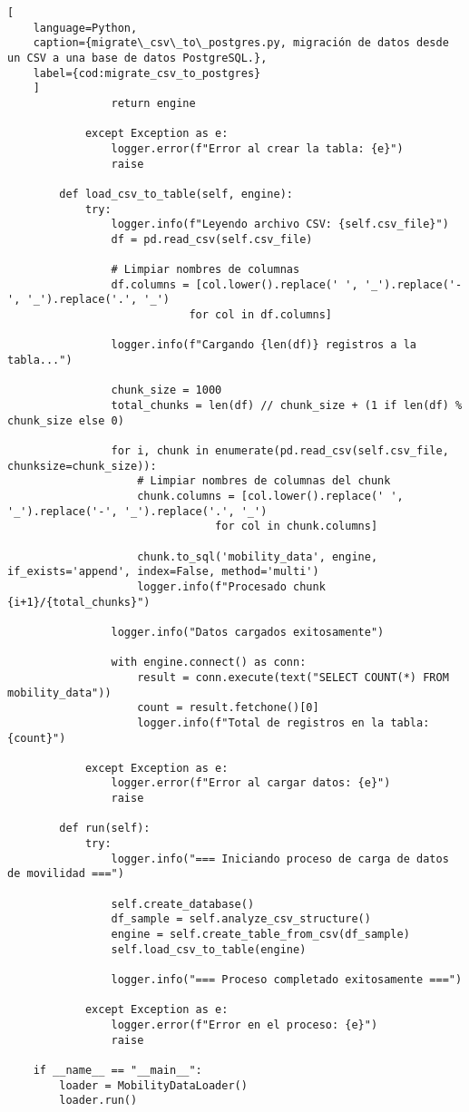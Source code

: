 \begin{lstlisting}[
    language=Python,
    caption={migrate\_csv\_to\_postgres.py, migración de datos desde un CSV a una base de datos PostgreSQL.},
    label={cod:migrate_csv_to_postgres}
    ]
                return engine
                
            except Exception as e:
                logger.error(f"Error al crear la tabla: {e}")
                raise
        
        def load_csv_to_table(self, engine):
            try:
                logger.info(f"Leyendo archivo CSV: {self.csv_file}")
                df = pd.read_csv(self.csv_file)
                
                # Limpiar nombres de columnas
                df.columns = [col.lower().replace(' ', '_').replace('-', '_').replace('.', '_') 
                            for col in df.columns]
                
                logger.info(f"Cargando {len(df)} registros a la tabla...")
                
                chunk_size = 1000
                total_chunks = len(df) // chunk_size + (1 if len(df) % chunk_size else 0)
                
                for i, chunk in enumerate(pd.read_csv(self.csv_file, chunksize=chunk_size)):
                    # Limpiar nombres de columnas del chunk
                    chunk.columns = [col.lower().replace(' ', '_').replace('-', '_').replace('.', '_') 
                                for col in chunk.columns]
                    
                    chunk.to_sql('mobility_data', engine, if_exists='append', index=False, method='multi')
                    logger.info(f"Procesado chunk {i+1}/{total_chunks}")
                
                logger.info("Datos cargados exitosamente")
                
                with engine.connect() as conn:
                    result = conn.execute(text("SELECT COUNT(*) FROM mobility_data"))
                    count = result.fetchone()[0]
                    logger.info(f"Total de registros en la tabla: {count}")
                    
            except Exception as e:
                logger.error(f"Error al cargar datos: {e}")
                raise
        
        def run(self):
            try:
                logger.info("=== Iniciando proceso de carga de datos de movilidad ===")
                
                self.create_database()
                df_sample = self.analyze_csv_structure()
                engine = self.create_table_from_csv(df_sample)
                self.load_csv_to_table(engine)
                
                logger.info("=== Proceso completado exitosamente ===")
                
            except Exception as e:
                logger.error(f"Error en el proceso: {e}")
                raise

    if __name__ == "__main__":
        loader = MobilityDataLoader()
        loader.run()
\end{lstlisting}
\vfill